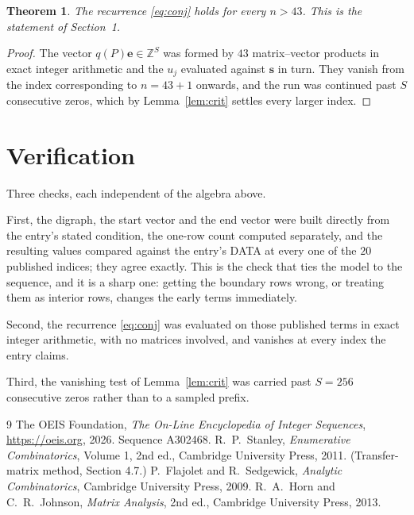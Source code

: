 \documentclass[11pt,a4paper]{article}
\theoremstyle{plain}
\newtheorem{theorem}{Theorem}
\theoremstyle{definition}
\begin{document}
\begin{theorem}
The recurrence \eqref{eq:conj} holds for every $n>43$. This is the statement of
Section~1.
\end{theorem}

\begin{proof}
The vector $q(P)\mathbf{e}\in\mathbb{Z}^{S}$ was formed by $43$ matrix--vector
products in exact integer arithmetic and the $u_j$ evaluated against $\mathbf{s}$ in turn.
They vanish from the index corresponding to $n=43+1$ onwards, and the run was continued
past $S$ consecutive zeros, which by Lemma~\ref{lem:crit} settles every larger index.
\end{proof}

\section{Verification}

Three checks, each independent of the algebra above.

First, the digraph, the start vector and the end vector were built directly from the
entry's stated condition, the one-row count computed separately, and the resulting values
compared against the entry's DATA at every one of the $20$ published indices; they
agree exactly. This is the check that ties the model to the sequence, and it is a sharp one:
getting the boundary rows wrong, or treating them as interior rows, changes the early terms
immediately.

Second, the recurrence \eqref{eq:conj} was evaluated on those published terms in exact
integer arithmetic, with no matrices involved, and vanishes at every index the entry claims.

Third, the vanishing test of Lemma~\ref{lem:crit} was carried past $S=256$ consecutive
zeros rather than to a sampled prefix.

\begin{thebibliography}{9}
 The OEIS Foundation, \emph{The On-Line Encyclopedia of Integer
Sequences}, \url{https://oeis.org}, 2026. Sequence A302468.
 R.~P.~Stanley, \emph{Enumerative Combinatorics}, Volume 1, 2nd ed.,
Cambridge University Press, 2011. (Transfer-matrix method, Section 4.7.)
 P.~Flajolet and R.~Sedgewick, \emph{Analytic Combinatorics}, Cambridge
University Press, 2009.
 R.~A.~Horn and C.~R.~Johnson, \emph{Matrix Analysis}, 2nd ed., Cambridge
University Press, 2013.
\end{thebibliography}
\end{document}
